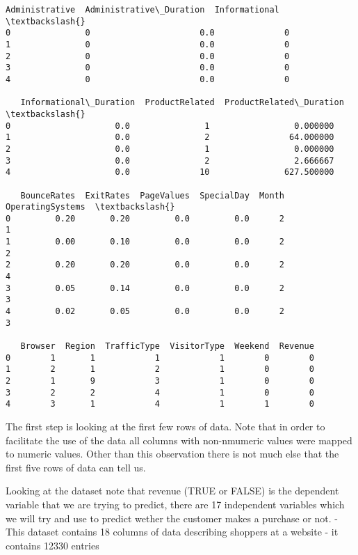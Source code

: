 \documentclass[11pt]{article}
\makeatletter
\newcommand{\boxspacing}{\kern\kvtcb@left@rule\kern\kvtcb@boxsep}
\newcommand{\prompt}[4]{
        {\ttfamily\llap{{\color{#2}[#3]:\hspace{3pt}#4}}\vspace{-\baselineskip}}
    }
\makeatother
\begin{document}
            \begin{tcolorbox}[breakable, size=fbox, boxrule=.5pt, pad at break*=1mm, opacityfill=0]
\prompt{Out}{outcolor}{4}{\boxspacing}
\begin{Verbatim}[commandchars=\\\{\}]
   Administrative  Administrative\_Duration  Informational  \textbackslash{}
0               0                      0.0              0
1               0                      0.0              0
2               0                      0.0              0
3               0                      0.0              0
4               0                      0.0              0

   Informational\_Duration  ProductRelated  ProductRelated\_Duration  \textbackslash{}
0                     0.0               1                 0.000000
1                     0.0               2                64.000000
2                     0.0               1                 0.000000
3                     0.0               2                 2.666667
4                     0.0              10               627.500000

   BounceRates  ExitRates  PageValues  SpecialDay  Month  OperatingSystems  \textbackslash{}
0         0.20       0.20         0.0         0.0      2                 1
1         0.00       0.10         0.0         0.0      2                 2
2         0.20       0.20         0.0         0.0      2                 4
3         0.05       0.14         0.0         0.0      2                 3
4         0.02       0.05         0.0         0.0      2                 3

   Browser  Region  TrafficType  VisitorType  Weekend  Revenue
0        1       1            1            1        0        0
1        2       1            2            1        0        0
2        1       9            3            1        0        0
3        2       2            4            1        0        0
4        3       1            4            1        1        0
\end{Verbatim}
\end{tcolorbox}
        
    The first step is looking at the first few rows of data. Note that in
order to facilitate the use of the data all columns with non-nmumeric
values were mapped to numeric values. Other than this observation there
is not much else that the first five rows of data can tell us.

    Looking at the dataset note that revenue (TRUE or FALSE) is the
dependent variable that we are trying to predict, there are 17
independent variables which we will try and use to predict wether the
customer makes a purchase or not. - This dataset contains 18 columns of
data describing shoppers at a website - it contains 12330 entries
\end{document}

